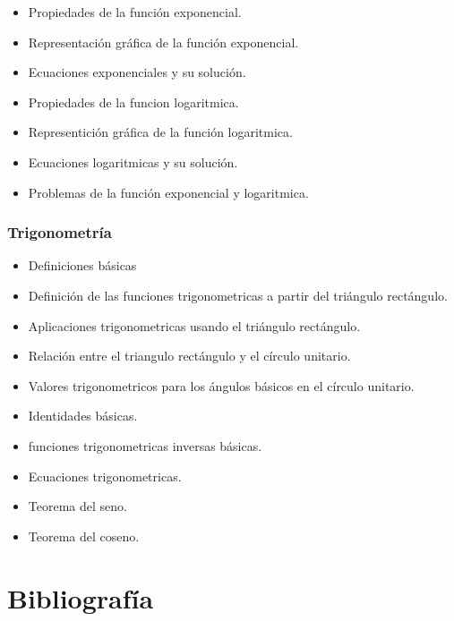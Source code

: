 \documentclass[]{book}
\providecommand{\tightlist}{%
  \setlength{\itemsep}{0pt}\setlength{\parskip}{0pt}}
\theoremstyle{definition}
\theoremstyle{definition}
\theoremstyle{definition}
\theoremstyle{remark}
\begin{document}
\begin{itemize}
\tightlist
\item
  Propiedades de la función exponencial.
\item
  Representación gráfica de la función exponencial.
\item
  Ecuaciones exponenciales y su solución.
\item
  Propiedades de la funcion logaritmica.
\item
  Representición gráfica de la función logaritmica.
\item
  Ecuaciones logaritmicas y su solución.
\item
  Problemas de la función exponencial y logaritmica.
\end{itemize}

\hypertarget{trigonometruxeda}{%
\subsubsection{\texorpdfstring{\textbf{Trigonometría}}{Trigonometría}}\label{trigonometruxeda}}

\begin{itemize}
\tightlist
\item
  Definiciones básicas
\item
  Definición de las funciones trigonometricas a partir del triángulo rectángulo.
\item
  Aplicaciones trigonometricas usando el triángulo rectángulo.
\item
  Relación entre el triangulo rectángulo y el círculo unitario.
\item
  Valores trigonometricos para los ángulos básicos en el círculo unitario.
\item
  Identidades básicas.
\item
  funciones trigonometricas inversas básicas.
\item
  Ecuaciones trigonometricas.
\item
  Teorema del seno.
\item
  Teorema del coseno.
\end{itemize}

\hypertarget{bibliografuxeda}{%
\section{Bibliografía}\label{bibliografuxeda}}
\end{document}
